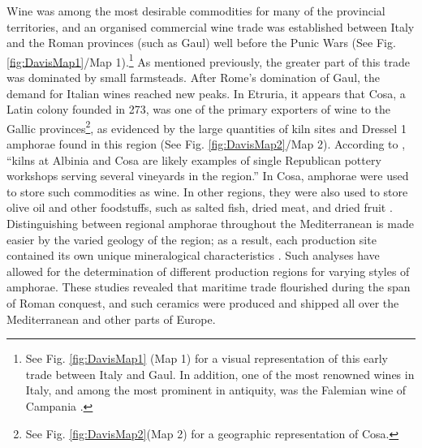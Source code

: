 
Wine was among the most desirable commodities for many of the provincial territories, and an organised commercial wine trade was established between Italy and the Roman provinces (such as Gaul) well before the Punic Wars \parencites[145]{Kay_2014}[163]{Kron_2012}[7]{Purcell_1985}(See Fig. \ref{fig:DavisMap1}/Map 1).\footnote{See Fig. \ref{fig:DavisMap1} (Map 1) for a visual representation of this early trade between Italy and Gaul. In addition, one of the most renowned wines in Italy, and among the most prominent in antiquity, was the Falemian wine of Campania \parencite[22]{Moore_1995}.} As mentioned previously, the greater part of this trade was dominated by small farmsteads. After Rome’s domination of Gaul, the demand for Italian wines reached new peaks. 
In Etruria, it appears that Cosa, a Latin colony founded in 273\BC, was one of the primary exporters of wine to the Gallic provinces\footnote{See Fig. \ref{fig:DavisMap2}(Map 2) for a geographic representation of Cosa.}, as evidenced by the large quantities of kiln sites and Dressel 1 amphorae found in this region (See Fig. \ref{fig:DavisMap2}/Map 2). 
According to \textcite[51]{Moore_1995}, “kilns at Albinia and Cosa are likely examples of single Republican pottery workshops serving several vineyards in the region.” 
In Cosa, amphorae were used to store such commodities as wine. In other regions, they were also used to store olive oil and other foodstuffs, such as salted fish, dried meat, and dried fruit \parencite[80]{Amadori_2002}. Distinguishing between regional amphorae throughout the Mediterranean is made easier by the varied geology of the region; as a result, each production site contained its own unique mineralogical characteristics \parencites{Olcese_2005}[262]{Peacock_1977}. Such analyses have allowed for the determination of different production regions for varying styles of amphorae. These studies revealed that maritime trade flourished during the span of Roman conquest, and such ceramics were produced and shipped all over the Mediterranean and other parts of Europe. 



